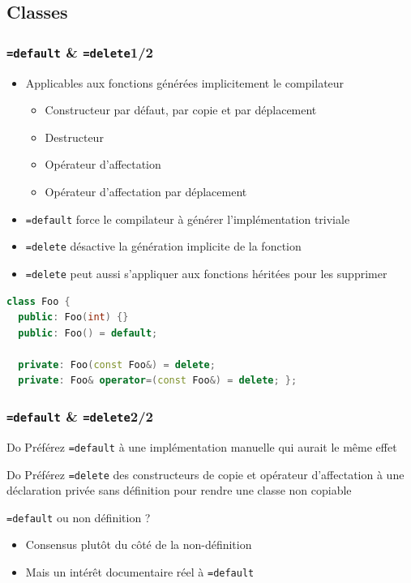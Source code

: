 \documentclass[C++.tex]{subfiles}
\begin{document}
\subsection*{Classes}
\begin{frame}[fragile]
	\frametitle{\lstinline|=default| \& \lstinline|=delete|\titlehfill{}1/2}
	\begin{itemize}
		\item Applicables aux fonctions générées implicitement le compilateur
		\begin{itemize}
			\item Constructeur par défaut, par copie et par déplacement
			\item Destructeur
			\item Opérateur d'affectation
			\item Opérateur d'affectation par déplacement
		\end{itemize}
		\item \lstinline|=default| force le compilateur à générer l'implémentation \og triviale\fg{}
		\item \lstinline|=delete| désactive la génération implicite de la fonction
		\item \lstinline|=delete| peut aussi s'appliquer aux fonctions héritées pour les supprimer
	\end{itemize}

	\begin{lstlisting}[language=C++]
class Foo {
  public: Foo(int) {}
  public: Foo() = default;

  private: Foo(const Foo&) = delete;
  private: Foo& operator=(const Foo&) = delete; };\end{lstlisting}
\end{frame}

\begin{frame}[fragile]
	\frametitle{\lstinline|=default| \& \lstinline|=delete|\titlehfill{}2/2}
	\begin{exampleblock}{Do}
		Préférez \lstinline|=default| à une implémentation manuelle qui aurait le même effet
	\end{exampleblock}

	\begin{exampleblock}{Do}
		Préférez \lstinline|=delete| des constructeurs de copie et opérateur d'affectation à une déclaration privée sans définition pour rendre une classe non copiable
	\end{exampleblock}

	\begin{block}{\lstinline|=default| ou non définition ?}

		\begin{itemize}
			\item Consensus plutôt du côté de la non-définition
			\item Mais un intérêt documentaire réel à \lstinline|=default|
		\end{itemize}
	\end{block}
\end{frame}
\end{document}
